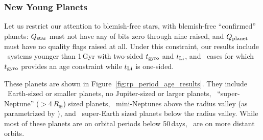 \documentclass[11pt,twocolumn,tighten]{aastex63}
\begin{document}
\subsubsection{New Young Planets}
%

Let us restrict our attention to blemish-free stars, with blemish-free
``confirmed'' planets:
$Q_{\rm star}$ must not have any of bits zero through nine
raised, and $Q_{\rm planet}$ must have no quality flags raised at all.
Under this constraint,
our results include \ltonegyrhighqconfirmedtwosided\ systems
younger than 1\,Gyr with two-sided $t_{\rm gyro}$ and $t_{\rm Li}$,
and \ltonegyrhighqconfirmedonesided\ cases for which $t_{\rm gyro}$ provides
an age constraint while $t_{\rm Li}$ is one-sided.

These planets are shown in Figure~\ref{fig:rp_period_age_results}.
They include \nearthshighqconfirmed\ Earth-sized or smaller planets,
no Jupiter-sized or larger planets,
\nsubsaturnshighqconfirmed\ ``super-Neptune'' ($>$4\,$R_\oplus$) sized
planets,
\nminineptuneshighqconfirmed\ mini-Neptunes above the 
radius valley (as parametrized by \citealt{2018MNRAS.479.4786V}),
and \nsuperearthshighqconfirmed\ super-Earth sized planets below the radius valley.
While most of these planets are on orbital periods below 50\,days,
\nlongperiodhighqconfirmed\ are on more distant orbits.

\end{document}

